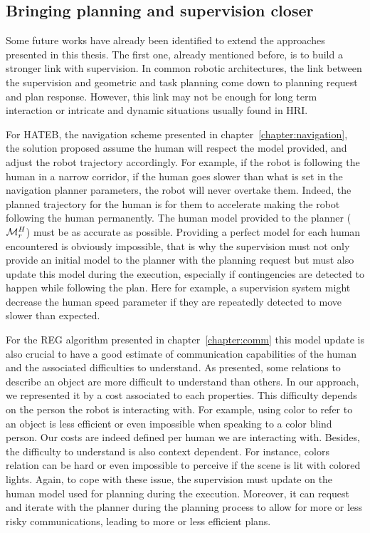 \documentclass[a4paper,11pt,twoside]{StyleThese}
\begin{document}
\subsection*{Bringing planning and supervision closer}
Some future works have already been identified to extend the approaches presented in this thesis. The first one, already mentioned before, is to build a stronger link with supervision. In common robotic architectures, the link between the supervision and geometric and task planning come down to planning request and plan response. However, this link may not be enough for long term interaction or intricate and dynamic situations usually found in HRI.

For HATEB, the navigation scheme presented in chapter~\ref{chapter:navigation}, the solution proposed assume the human will respect the model provided, and adjust the robot trajectory accordingly. For example, if the robot is following the human in a narrow corridor, if the human goes slower than what is set in the navigation planner parameters, the robot will never overtake them. Indeed, the planned trajectory for the human is for them to accelerate making the robot following the human permanently. The human model provided to the planner ($\mathcal{M}^H_r$) must be as accurate as possible. Providing a perfect model for each human encountered is obviously impossible, that is why the supervision must not only provide an initial model to the planner with the planning request but must also update this model during the execution, especially if contingencies are detected to happen while following the plan. Here for example, a supervision system might decrease the human speed parameter if they are repeatedly detected to move slower than expected.

For the REG algorithm presented in chapter~\ref{chapter:comm} this model update is also crucial to have a good estimate of communication capabilities of the human and the associated difficulties to understand. As presented, some relations to describe an object are more difficult to understand than others. In our approach, we represented it by a cost associated to each properties. This difficulty depends on the person the robot is interacting with. For example, using color to refer to an object is less efficient or even impossible when speaking to a color blind person. Our costs are indeed defined per human we are interacting with. Besides, the difficulty to understand is also context dependent. For instance, colors relation can be hard or even impossible to perceive if the scene is lit with colored lights. Again, to cope with these issue, the supervision must update on the human model used for planning during the execution. Moreover, it can request and iterate with the planner during the planning process to allow for more or less risky communications, leading to more or less efficient plans.
\end{document}
